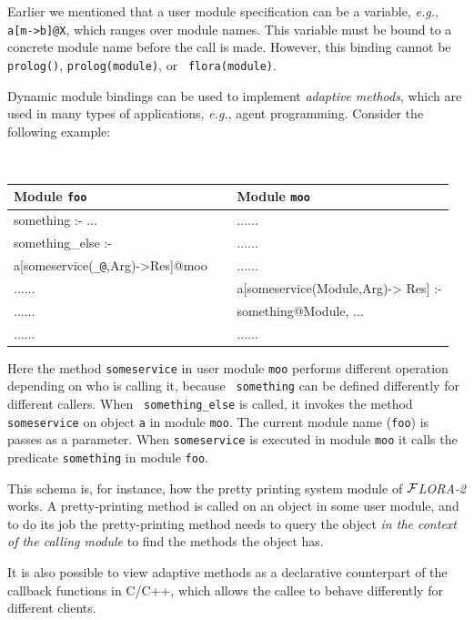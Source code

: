 \documentclass[11pt]{article}
\makeatletter
\newcommand{\thismodule}{{\tt \_@}\xspace}
\newcommand{\FLORA}{{\mbox{${\cal F}${\small\it LORA}\rm\emph{-2}}}\xspace}
\makeatother
\begin{document}
Earlier we mentioned that a user module specification can be a variable, {\it
  e.g.}, {\tt a[m->b]@X}, which ranges over module names. This variable
must be bound to a concrete module name before the call is made. However,
this binding cannot be {\tt prolog()}, {\tt prolog(module)}, or {\tt
  flora(module)}.

Dynamic module bindings can be used to implement \emph{adaptive methods},
which are used in  many types of applications, {\it e.g.}, agent
programming. Consider the following example:
  \begin{center}
    {\tt
    \begin{tabular}{l l}
      Module {\tt foo}  & Module {\tt moo} \\
      \hline
      something :- ... & ......\\
      something\_else :- & ......\\
      \hspace*{1.5cm}a[someservice(\thismodule,Arg)->Res]@moo ~~& ......\\
      ...... & a[someservice(Module,Arg)-> Res] :- \\
      ...... & \hspace*{2.2cm} something@Module, ...\\
      ...... & ......
      
    \end{tabular}
    }
  \end{center}
  
  Here the method {\tt someservice} in user module {\tt moo} performs
  different operation depending on who is calling it, because {\tt
    something} can be defined differently for different callers.  When {\tt
    something\_else} is called, it invokes the method {\tt someservice} on
  object {\tt a} in module {\tt moo}. The current module name ({\tt foo})
  is passes as a parameter. When {\tt someservice} is executed in module
  {\tt moo} it calls the predicate {\tt something} in module {\tt foo}.
  
  This schema is, for instance, how the pretty printing system module of
  \FLORA works. A pretty-printing method is called on an object in some
  user module, and to do its job the pretty-printing method needs to query
  the object \emph{in the context of the calling module} to find the
  methods the object has.

It is also possible to view adaptive methods as a declarative counterpart
of the callback functions in C/C++, which allows the callee to behave
differently for different clients.
\end{document}
